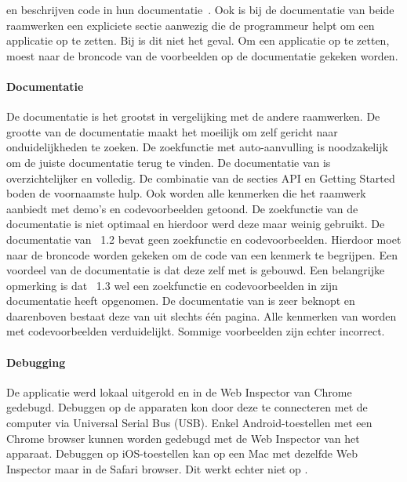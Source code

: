 \jqm{} en \kendo{} beschrijven  code in hun documentatie~\cite{JQuery2012b,Telerikd}.
Ook is bij de documentatie van beide raamwerken een expliciete sectie aanwezig die de programmeur helpt om een applicatie op te zetten.
Bij \lungo{} is dit niet het geval.  
Om een \lungo{} applicatie op te zetten, moest naar de broncode van de voorbeelden op de documentatie gekeken worden.

\paragraph{Documentatie}
De \st{} documentatie is het grootst in vergelijking met de andere raamwerken.
De grootte van de documentatie maakt het moeilijk om zelf gericht naar onduidelijkheden te zoeken.
De zoekfunctie met auto-aanvulling is noodzakelijk om de juiste documentatie terug te vinden.
De documentatie van \kendo{} is overzichtelijker en volledig.
De combinatie van de secties API en Getting Started boden de voornaamste hulp.
Ook worden alle kenmerken die het raamwerk aanbiedt met demo's en codevoorbeelden getoond.
De zoekfunctie van de documentatie is niet optimaal en hierdoor werd deze maar weinig gebruikt.
De documentatie van \jqm{}~1.2 bevat geen zoekfunctie en codevoorbeelden.
Hierdoor moet naar de broncode worden gekeken om de code van een kenmerk te begrijpen.
Een voordeel van de \jqm{} documentatie is dat deze zelf met \jqm{} is gebouwd.
Een belangrijke opmerking is dat \jqm{}~1.3 wel een zoekfunctie en codevoorbeelden in zijn documentatie heeft opgenomen.
De documentatie van \lungo{} is zeer beknopt en daarenboven bestaat deze van \quo{} uit slechts één pagina.
Alle kenmerken van \lungo{} worden met codevoorbeelden verduidelijkt.
Sommige voorbeelden zijn echter incorrect.

\paragraph{Debugging}
De applicatie werd lokaal uitgerold en in de Web Inspector van Chrome gedebugd.
Debuggen op de apparaten kon door deze te connecteren met de computer via Universal Serial Bus (USB).
Enkel Android-toestellen met een Chrome browser kunnen worden gedebugd met de Web Inspector van het apparaat.
Debuggen op iOS-toestellen kan op een Mac met dezelfde Web Inspector maar in de Safari browser.
Dit werkt echter niet op \ipadi{}.

